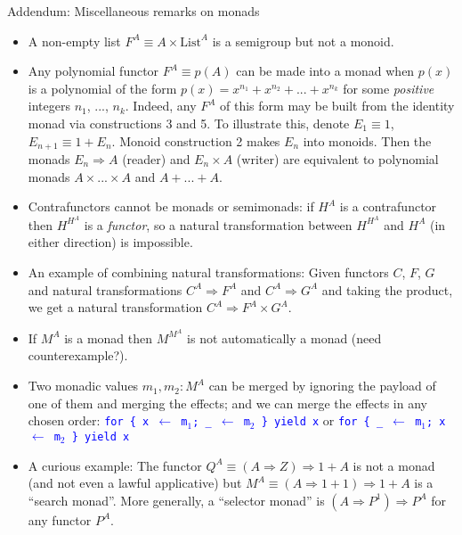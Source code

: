 \documentclass[english]{beamer}
\begin{document}
\begin{frame}{Addendum: Miscellaneous remarks on monads}
\begin{itemize}
\item {\footnotesize{}\vspace{-0.2cm}A non-empty list $F^{A}\equiv A\times\text{List}^{A}$
is a semigroup but not a monoid.}{\footnotesize\par}
\item {\footnotesize{}Any polynomial functor $F^{A}\equiv p(A)$ can be
made into a monad when $p(x)$ is a polynomial of the form $p(x)=x^{n_{1}}+x^{n_{2}}+...+x^{n_{k}}$
for some }\emph{\footnotesize{}positive}{\footnotesize{} integers
$n_{1}$, ..., $n_{k}$. Indeed, any $F^{A}$ of this form may be
built from the identity monad via constructions 3 and 5. To illustrate
this, denote $E_{1}\equiv1$, $E_{n+1}\equiv1+E_{n}$. Monoid construction
2 makes $E_{n}$ into monoids. Then the monads $E_{n}\Rightarrow A$
(reader) and $E_{n}\times A$ (writer) are equivalent to polynomial
monads $A\times...\times A$ and $A+...+A$.}{\footnotesize\par}
\item {\footnotesize{}Contrafunctors cannot be monads or semimonads: if
$H^{A}$ is a contrafunctor then $H^{H^{A}}$ is a }\emph{\footnotesize{}functor}{\footnotesize{},
so a natural transformation between $H^{H^{A}}$ and $H^{A}$ (in
either direction) is impossible.}{\footnotesize\par}
\item {\footnotesize{}An example of combining natural transformations: Given
functors $C$, $F$, $G$ and natural transformations $C^{A}\Rightarrow F^{A}$
and $C^{A}\Rightarrow G^{A}$ and taking the product, we get a natural
transformation $C^{A}\Rightarrow F^{A}\times G^{A}$. }{\footnotesize\par}
\item {\footnotesize{}If $M^{A}$ is a monad then $M^{M^{A}}$ is not automatically
a monad (need counterexample?).}{\footnotesize\par}
\item {\footnotesize{}Two monadic values $m_{1},m_{2}:M^{A}$ can be merged
by ignoring the payload of one of them and merging the effects; and
we can merge the effects in any chosen order: }\texttt{\textcolor{blue}{\footnotesize{}for
\{ x $\leftarrow$ m$_{1}$; \_ $\leftarrow$ m$_{2}$ \} yield x}}{\footnotesize{}
or }\texttt{\textcolor{blue}{\footnotesize{}for \{ \_ $\leftarrow$
m$_{1}$; x $\leftarrow$ m$_{2}$ \} yield x}} 
\item {\footnotesize{}A curious example: The functor $Q^{A}\equiv\left(A\Rightarrow Z\right)\Rightarrow1+A$
is not a monad (and not even a lawful applicative) but $M^{A}\equiv\left(A\Rightarrow1+1\right)\Rightarrow1+A$
is a ``search monad''. More generally, a ``selector monad'' is
$\left(A\Rightarrow P^{1}\right)\Rightarrow P^{A}$ for any functor
$P^{A}$.}{\footnotesize\par}
\end{itemize}
\end{frame}
\end{document}
